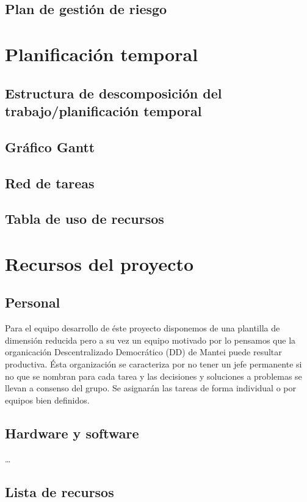 \documentclass[11pt, a4paper, twoside]{report}
\begin{document}
		\subsection{Plan de gestión de riesgo}
	\section{Planificación temporal}		
		\subsection{Estructura de descomposición del trabajo/planificación temporal}
			 
		\subsection{Gráfico Gantt}
		\subsection{Red de tareas}
		\subsection{Tabla de uso de recursos}
	\section{Recursos del proyecto}
		\subsection{Personal}
		Para el equipo desarrollo de éste proyecto disponemos de una plantilla de dimensión reducida pero a su vez un equipo motivado por lo pensamos que la organicación Descentralizado Democrático (DD) de Mantei puede resultar productiva. Ésta organización se caracteriza por no tener un jefe permanente si no que se nombran para cada tarea y las decisiones y soluciones a problemas se llevan a consenso del grupo. Se asignarán las tareas de forma individual o por equipos bien definidos.

		\subsection{Hardware y software}
			\ldots

		\subsection{Lista de recursos}
			
\end{document}
